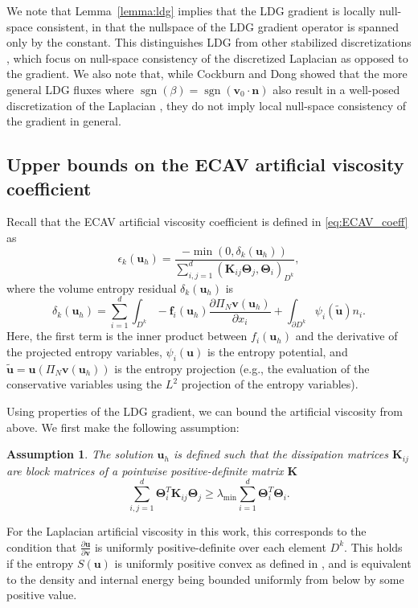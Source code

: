 \documentclass{elsarticle}
\theoremstyle{definition}
\theoremstyle{plain}
\theoremstyle{plain}
\newtheorem{assumption}{Assumption}
\newcommand{\pd}[2]{\frac{\partial#1}{\partial#2}}
\newcommand{\LRp}[1]{\left( #1 \right)} %
\DeclareMathOperator{\sgn}{sgn}
\newcommand{\refone}[1]{{\color{red}#1}}
\newcommand{\reftwo}[1]{{\color{blue}#1}}
\renewcommand{\refone}[1]{#1}
\renewcommand{\reftwo}[1]{#1}
\begin{document}
We note that Lemma~\ref{lemma:ldg} implies that the LDG gradient is locally null-space consistent, in that the nullspace of the LDG gradient operator is spanned only by the constant. This distinguishes LDG from other stabilized discretizations \cite{arnold2002unified}, which focus on null-space consistency of the discretized Laplacian as opposed to the gradient. We also note that, while Cockburn and Dong showed that the more general LDG fluxes where $\refone{\sgn{(\beta)} = \sgn{(\bm{v}_0 \cdot \bm{n})}}$ also result in a well-posed discretization of the Laplacian \cite{cockburn2007analysis}, they do not imply local null-space consistency of the gradient in general. 

\subsection{Upper bounds on the ECAV artificial viscosity coefficient}

Recall that the ECAV artificial viscosity coefficient is defined in \eqref{eq:ECAV_coeff} as 
\[
\epsilon_{k}(\bm{u}_h) = \frac{-\refone{\min{\left(0, \delta_k(\bm{u}_h)\right)}}}{\sum_{i,j=1}^d \LRp{\bm{K}_{ij}\bm{\Theta}_j, \bm{\Theta}_i}_{D^k}}
\refone{,}
\]
where the volume entropy residual $\delta_k(\bm{u}_h)$ is 
\[
\delta_k(\bm{u}_h) = \sum_{i=1}^d \int_{D^k} -\bm{f}_i(\bm{u}_h) \pd{\Pi_N \bm{v}(\bm{u}_h)}{x_i}  + \int_{\partial D^k} \psi_i(\tilde{\bm{u}})n_i.
\]
Here, \reftwo{the first term is the inner product between $f_i(\bm{u}_h)$ and the derivative of the projected entropy variables,} $\psi_i(\bm{u})$ is the entropy potential\reftwo{,} and $\tilde{\bm{u}} = \bm{u}(\Pi_N \bm{v}(\bm{u}_h))$ is the entropy projection (e.g., the evaluation of the conservative variables using the $L^2$ projection of the entropy variables). 

Using properties of the LDG gradient, we can bound the artificial viscosity from above. We first make the following assumption:
\begin{assumption}
\label{assumption:admissibility}
\reftwo{The solution $\bm{u}_h$ is defined such that the dissipation matrices $\bm{K}_{ij}$ are block matrices of a pointwise positive-definite matrix $\bm{K}$}
\[
\sum_{i,j=1}^d \bm{\Theta}_i^T \bm{K}_{ij}\bm{\Theta}_j \geq \lambda_{\min} \sum_{i=1}^d \bm{\Theta}_i^T\bm{\Theta}_i. 
\]
\end{assumption}
For the Laplacian artificial viscosity in this work, this corresponds to the condition that $\pd{\bm{u}}{\bm{v}}$ is \reftwo{uniformly positive-definite over each element $D^k$}. This holds if the entropy $S(\bm{u})$ is \reftwo{uniformly positive convex as defined in \cite{lukavcova2025note}}, and is equivalent to the density and internal energy being bounded uniformly from below by some positive value. 
\end{document}
